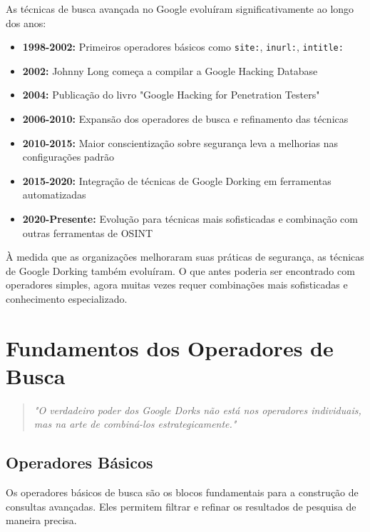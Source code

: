 \documentclass[12pt,a4paper]{book}
\begin{document}
As técnicas de busca avançada no Google evoluíram significativamente ao longo dos anos:

\begin{itemize}
    \item \textbf{1998-2002:} Primeiros operadores básicos como \texttt{site:}, \texttt{inurl:}, \texttt{intitle:}
    \item \textbf{2002:} Johnny Long começa a compilar a Google Hacking Database
    \item \textbf{2004:} Publicação do livro "Google Hacking for Penetration Testers"
    \item \textbf{2006-2010:} Expansão dos operadores de busca e refinamento das técnicas
    \item \textbf{2010-2015:} Maior conscientização sobre segurança leva a melhorias nas configurações padrão
    \item \textbf{2015-2020:} Integração de técnicas de Google Dorking em ferramentas automatizadas
    \item \textbf{2020-Presente:} Evolução para técnicas mais sofisticadas e combinação com outras ferramentas de OSINT
\end{itemize}

\begin{notebox}
À medida que as organizações melhoraram suas práticas de segurança, as técnicas de Google Dorking também evoluíram. O que antes poderia ser encontrado com operadores simples, agora muitas vezes requer combinações mais sofisticadas e conhecimento especializado.
\end{notebox}

\chapter{Fundamentos dos Operadores de Busca}

\begin{quote}
\textit{"O verdadeiro poder dos Google Dorks não está nos operadores individuais, mas na arte de combiná-los estrategicamente."} \\
\end{quote}

\section{Operadores Básicos}

Os operadores básicos de busca são os blocos fundamentais para a construção de consultas avançadas. Eles permitem filtrar e refinar os resultados de pesquisa de maneira precisa.
\end{document}
